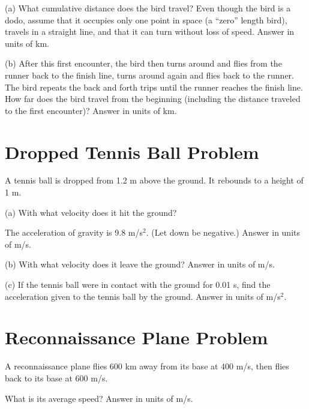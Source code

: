 \documentclass[../physics12.tex]{subfiles}
\begin{document}
(a) What cumulative distance does the bird travel? Even though the bird is a dodo, assume that it occupies only one point in space (a ``zero'' length bird), travels in a straight line, and that it can turn without loss of speed.
Answer in units of km.

(b) After this first encounter, the bird then turns around and flies from the runner back to the finish line, turns around again and flies back to the runner. The bird repeats the back and 
forth trips until the runner reaches the finish line. How far does the bird travel from the beginning (including the distance traveled to the first encounter)? Answer in units of km.

\section{Dropped Tennis Ball Problem}
A tennis ball is dropped from 1.2 m above the ground. It rebounds to a height of 1 m. 

(a) With what velocity does it hit the ground? 

The acceleration of gravity is 9.8 m/s$^2$. (Let down be negative.)
Answer in units of m/s.

(b) With what velocity does it leave the ground? 
Answer in units of m/s.

(c) If the tennis ball were in contact with the ground for 0.01 s, find the acceleration given to the tennis ball by the ground.
Answer in units of m/s$^2$.

\section{Reconnaissance Plane Problem}
A reconnaissance plane flies 600 km away from its base at 400 m/s, then flies back to its base at 600 m/s. 

What is its average speed?
Answer in units of m/s.
\end{document}
